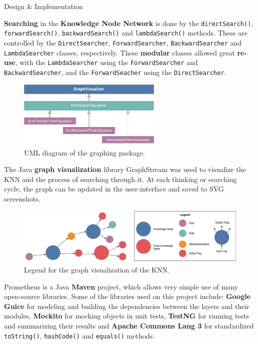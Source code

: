\documentclass[final]{beamer} %
\newcommand{\code}[1]{\texttt{#1}}
\begin{document}
\begin{frame}
\begin{columns}
\begin{column}{.33\textwidth}
{\begin{block}{Design \& Implementation}
					\parbox{0.99\textwidth}{
					 \textbf{Searching} in the \textbf{Knowledge Node Network} is done by the \code{directSearch()}, \code{forwardSearch()}, \code{backwardSearch()} and \code{lambdaSearch()} methods. These are controlled by the \code{DirectSearcher}, \code{ForwardSearcher}, \code{BackwardSearcher} and \code{LambdaSearcher} classes, respectively. These \textbf{modular} classes allowed great \textbf{re-use}, with the \code{LambdaSearcher} using the \code{ForwardSearcher} and \code{BackwardSearcher}, and the \code{ForwardSeacher} using the \code{DirectSearcher}.}
			
					\begin{figure}
						\centering
						\includegraphics[width=0.6125\textwidth]{figures/uml_graphing.pdf}
						\caption{UML diagram of the graphing package.}
					\end{figure}
				
				\parbox{0.99\textwidth}{
				The Java \textbf{graph visualization} library GraphStream was used to visualize the KNN and the process of searching through it. At each thinking or searching cycle, the graph can be updated in the user-interface and saved to SVG screenshots.}
					
					\begin{figure}[!htb]
						\centering
						\includegraphics[width=\columnwidth]{figures/knn_graph_legend.pdf}
						\caption
						{Legend for the graph visualization of the KNN.}
						\label{fig:knn_legend}
					\end{figure}
				
				
				\parbox{0.99\textwidth}{
					Prometheus is a Java \textbf{Maven} project, which allows very simple use of many open-source libraries. Some of the libraries used on this project include: \textbf{Google Guice} for modeling and building the dependencies between the layers and their modules, \textbf{Mockito} for mocking objects in unit tests, \textbf{TestNG} for running tests and summarizing their results and \textbf{Apache Commons Lang 3} for standardized \code{toString()}, \code{hashCode()} and \code{equals()} methods.}
					

\end{block}}
\end{column}
\end{columns}
\end{frame}
\end{document}
